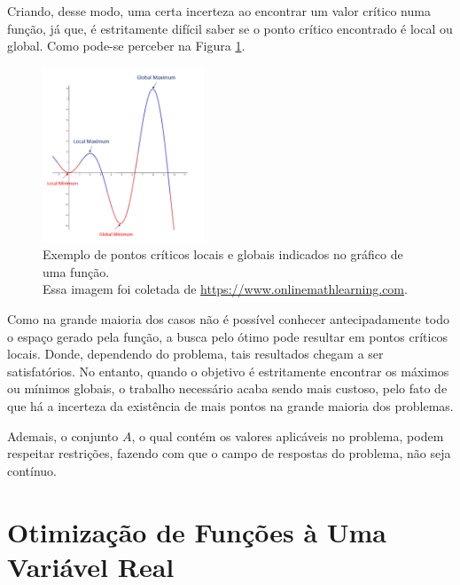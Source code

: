 Criando, desse modo, uma certa incerteza ao encontrar um valor crítico numa função,
já que, é estritamente difícil saber se o ponto crítico encontrado é local ou
global. Como pode-se perceber na Figura
\ref{grafico_local_global_pontosCriticos}.

\begin{figure}[h]
    \centering
    \includegraphics[width=0.43\textwidth]
    {src/grafico_local_global_pontosCriticos.png}
    \caption{
      \centering %
      Exemplo de pontos críticos locais e globais indicados no gráfico de uma
      função.\\
      {
        \tiny %
        Essa imagem foi coletada de \url{https://www.onlinemathlearning.com}.
      }
    }
    \label{grafico_local_global_pontosCriticos}
\end{figure}

Como na grande maioria dos casos não é possível conhecer antecipadamente todo
o espaço gerado pela função, a busca pelo ótimo pode resultar em pontos
críticos locais. Donde, dependendo do problema, tais resultados chegam a ser
satisfatórios. No entanto, quando o objetivo é estritamente encontrar os máximos
ou mínimos globais, o trabalho necessário acaba sendo mais custoso, pelo fato de
que há a incerteza da existência de mais pontos na grande maioria dos problemas.

Ademais, o conjunto $A$, o qual contém os valores aplicáveis no problema, podem
respeitar restrições, fazendo com que o campo de respostas do problema, não seja
contínuo.

\section{{Otimização de Funções à Uma Variável Real}}

\hspace{0.8cm}

